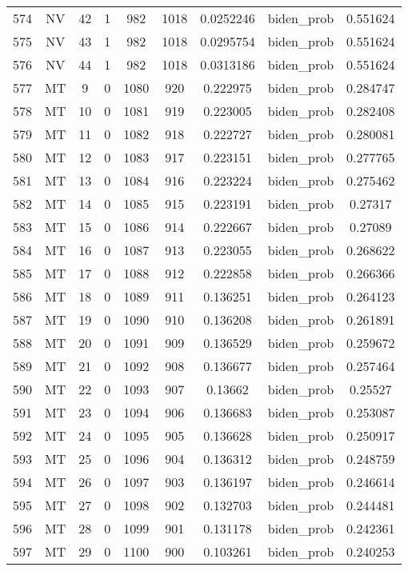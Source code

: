 \documentclass[12pt,a4paper]{article}
\begin{document}
\begin{tabular}{r|cccccccc}
	574 & NV & 42 & 1 & 982 & 1018 & 0.0252246 & biden\_prob & 0.551624 \\
	575 & NV & 43 & 1 & 982 & 1018 & 0.0295754 & biden\_prob & 0.551624 \\
	576 & NV & 44 & 1 & 982 & 1018 & 0.0313186 & biden\_prob & 0.551624 \\
	577 & MT & 9 & 0 & 1080 & 920 & 0.222975 & biden\_prob & 0.284747 \\
	578 & MT & 10 & 0 & 1081 & 919 & 0.223005 & biden\_prob & 0.282408 \\
	579 & MT & 11 & 0 & 1082 & 918 & 0.222727 & biden\_prob & 0.280081 \\
	580 & MT & 12 & 0 & 1083 & 917 & 0.223151 & biden\_prob & 0.277765 \\
	581 & MT & 13 & 0 & 1084 & 916 & 0.223224 & biden\_prob & 0.275462 \\
	582 & MT & 14 & 0 & 1085 & 915 & 0.223191 & biden\_prob & 0.27317 \\
	583 & MT & 15 & 0 & 1086 & 914 & 0.222667 & biden\_prob & 0.27089 \\
	584 & MT & 16 & 0 & 1087 & 913 & 0.223055 & biden\_prob & 0.268622 \\
	585 & MT & 17 & 0 & 1088 & 912 & 0.222858 & biden\_prob & 0.266366 \\
	586 & MT & 18 & 0 & 1089 & 911 & 0.136251 & biden\_prob & 0.264123 \\
	587 & MT & 19 & 0 & 1090 & 910 & 0.136208 & biden\_prob & 0.261891 \\
	588 & MT & 20 & 0 & 1091 & 909 & 0.136529 & biden\_prob & 0.259672 \\
	589 & MT & 21 & 0 & 1092 & 908 & 0.136677 & biden\_prob & 0.257464 \\
	590 & MT & 22 & 0 & 1093 & 907 & 0.13662 & biden\_prob & 0.25527 \\
	591 & MT & 23 & 0 & 1094 & 906 & 0.136683 & biden\_prob & 0.253087 \\
	592 & MT & 24 & 0 & 1095 & 905 & 0.136628 & biden\_prob & 0.250917 \\
	593 & MT & 25 & 0 & 1096 & 904 & 0.136312 & biden\_prob & 0.248759 \\
	594 & MT & 26 & 0 & 1097 & 903 & 0.136197 & biden\_prob & 0.246614 \\
	595 & MT & 27 & 0 & 1098 & 902 & 0.132703 & biden\_prob & 0.244481 \\
	596 & MT & 28 & 0 & 1099 & 901 & 0.131178 & biden\_prob & 0.242361 \\
	597 & MT & 29 & 0 & 1100 & 900 & 0.103261 & biden\_prob & 0.240253 \\

\end{tabular}
\end{document}
